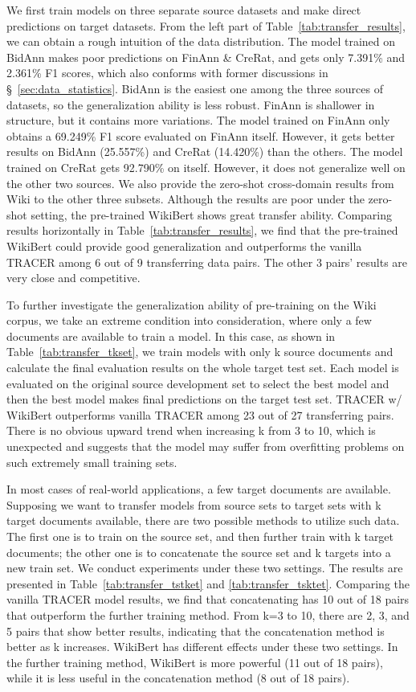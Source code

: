 \documentclass[runningheads]{llncs}
\begin{document}
We first train models on three separate source datasets and make direct predictions on target datasets.
From the left part of Table~\ref{tab:transfer_results}, we can obtain a rough intuition of the data distribution.
The model trained on BidAnn makes poor predictions on FinAnn \& CreRat, and gets only 7.391\% and 2.361\% F1 scores, which also conforms with former discussions in \S~\ref{sec:data_statistics}.
BidAnn is the easiest one among the three sources of datasets, so the generalization ability is less robust.
FinAnn is shallower in structure, but it contains more variations.
The model trained on FinAnn only obtains a 69.249\% F1 score evaluated on FinAnn itself.
However, it gets better results on BidAnn (25.557\%) and CreRat (14.420\%) than the others.
The model trained on CreRat gets 92.790\% on itself.
However, it does not generalize well on the other two sources.
We also provide the zero-shot cross-domain results from Wiki to the other three subsets.
Although the results are poor under the zero-shot setting, the pre-trained WikiBert shows great transfer ability.
Comparing results horizontally in Table~\ref{tab:transfer_results}, we find that the pre-trained WikiBert could provide good generalization and outperforms the vanilla TRACER among 6 out of 9 transferring data pairs.
The other 3 pairs' results are very close and competitive.


To further investigate the generalization ability of pre-training on the Wiki corpus, we take an extreme condition into consideration, where only a few documents are available to train a model.
In this case, as shown in Table~\ref{tab:transfer_tkset}, we train models with only k source documents and calculate the final evaluation results on the whole target test set.
Each model is evaluated on the original source development set to select the best model and then the best model makes final predictions on the target test set.
TRACER w/ WikiBert outperforms vanilla TRACER among 23 out of 27 transferring pairs.
There is no obvious upward trend when increasing k from 3 to 10, which is unexpected and suggests that the model may suffer from overfitting problems on such extremely small training sets.

In most cases of real-world applications, a few target documents are available.
Supposing we want to transfer models from source sets to target sets with k target documents available, there are two possible methods to utilize such data.
The first one is to train on the source set, and then further train with k target documents; the other one is to concatenate the source set and k targets into a new train set.
We conduct experiments under these two settings. The results are presented in Table~\ref{tab:transfer_tstket} and \ref{tab:transfer_tsktet}.
Comparing the vanilla TRACER model results, we find that concatenating has 10 out of 18 pairs that outperform the further training method.
From k=3 to 10, there are 2, 3, and 5 pairs that show better results, indicating that the concatenation method is better as k increases.
WikiBert has different effects under these two settings.
In the further training method, WikiBert is more powerful (11 out of 18 pairs), while it is less useful in the concatenation method (8 out of 18 pairs).
\end{document}
